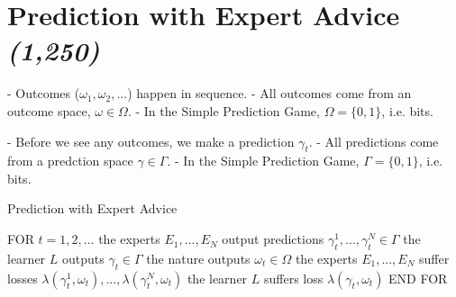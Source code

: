 \section{Prediction with Expert Advice \textit{(1,250)}}\label{section:Prediciton_with_Expert_Advice}
- Outcomes ($\omega_1, \omega_2, ...$) happen in sequence.
- All outcomes come from an outcome space, $\omega \in \Omega$.
- In the Simple Prediction Game, $\Omega = \{0, 1\}$, i.e. bits.

- Before we see any outcomes, we make a prediction $\gamma_t$.
- All predictions come from a predction space $\gamma \in \Gamma$.
- In the Simple Prediction Game, $\Gamma = \{0, 1\}$, i.e. bits.


\begin{algorithm}
    \caption{Prediction with Expert Advice}\label{alg:cap}
    \begin{algorithmic}[1]
        \State FOR $t = 1, 2, ...$
        \State \hspace{\algorithmicindent} the experts $E_1, ..., E_N$ output predictions $\gamma^1_t, ..., \gamma^N_t \in \Gamma$
        \State \hspace{\algorithmicindent} the learner $L$ outputs $\gamma_t \in \Gamma$
        \State \hspace{\algorithmicindent} the nature outputs $\omega_t \in \Omega$
        \State \hspace{\algorithmicindent} the experts $E_1, ..., E_N$ suffer losses $\lambda(\gamma^1_t, \omega_t), ..., \lambda(\gamma^N_t, \omega_t)$
        \State \hspace{\algorithmicindent} the learner $L$ suffers loss $\lambda(\gamma_t, \omega_t)$
        \State END FOR
    \end{algorithmic}
\end{algorithm}
